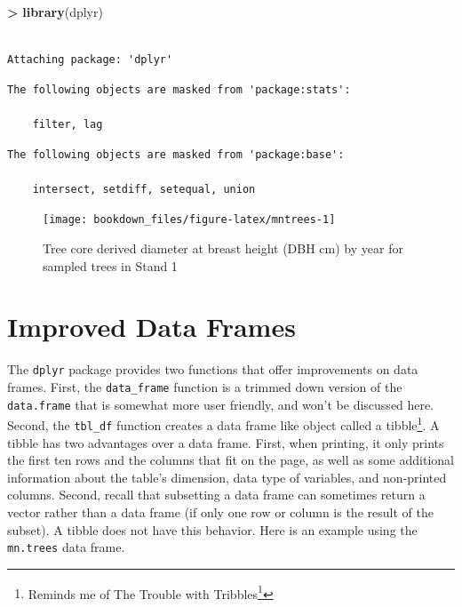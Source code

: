 \documentclass[]{krantz}
\makeatletter
\newenvironment{Shaded}{\begin{snugshade}}{\end{snugshade}}
\newcommand{\KeywordTok}[1]{\textcolor[rgb]{0.27,0.27,0.27}{\textbf{#1}}}
\newcommand{\StringTok}[1]{\textcolor[rgb]{0.5,0.5,0.5}{#1}}
\newcommand{\OperatorTok}[1]{\textcolor[rgb]{0.43,0.43,0.43}{\textbf{#1}}}
\newcommand{\NormalTok}[1]{#1}
\renewcommand{\href}[2]{#2\footnote{\url{#1}}}
\newenvironment{kframe}{%
\medskip{}
\setlength{\fboxsep}{.8em}
 \def\at@end@of@kframe{}%
 \ifinner\ifhmode%
  \def\at@end@of@kframe{\end{minipage}}%
  \begin{minipage}{\columnwidth}%
 \fi\fi%
 \def\FrameCommand##1{\hskip\@totalleftmargin \hskip-\fboxsep
 \colorbox{shadecolor}{##1}\hskip-\fboxsep
     \hskip-\linewidth \hskip-\@totalleftmargin \hskip\columnwidth}%
 \MakeFramed {\advance\hsize-\width
   \@totalleftmargin\z@ \linewidth\hsize
   \@setminipage}}%
 {\par\unskip\endMakeFramed%
 \at@end@of@kframe}
\renewenvironment{Shaded}{\begin{kframe}}{\end{kframe}}
\theoremstyle{definition}
\theoremstyle{definition}
\theoremstyle{definition}
\theoremstyle{remark}
\makeatother
\begin{document}
\begin{Shaded}
\begin{Highlighting}[]
\OperatorTok{>}\StringTok{ }\KeywordTok{library}\NormalTok{(dplyr)}
\end{Highlighting}
\end{Shaded}

\begin{verbatim}

Attaching package: 'dplyr'
\end{verbatim}

\begin{verbatim}
The following objects are masked from 'package:stats':

    filter, lag
\end{verbatim}

\begin{verbatim}
The following objects are masked from 'package:base':

    intersect, setdiff, setequal, union
\end{verbatim}

\begin{figure}

{\centering \texttt{[image: bookdown\_files/figure-latex/mntrees-1]} 

}

\caption{Tree core derived diameter at breast height (DBH cm) by year for sampled trees in Stand 1}\label{fig:mntrees}
\end{figure}

\section{Improved Data Frames}\label{improved-data-frames}

The \texttt{dplyr} package provides two functions that offer
improvements on data frames. First, the \texttt{data\_frame} function is
a trimmed down version of the \texttt{data.frame} that is somewhat more
user friendly, and won't be discussed here. Second, the \texttt{tbl\_df}
function creates a data frame like object called a tibble\footnote{Reminds
  me of
  \href{https://en.wikipedia.org/wiki/The_Trouble_with_Tribbles}{The
  Trouble with Tribbles}}. A tibble has two advantages over a data
frame. First, when printing, it only prints the first ten rows and the
columns that fit on the page, as well as some additional information
about the table's dimension, data type of variables, and non-printed
columns. Second, recall that subsetting a data frame can sometimes
return a vector rather than a data frame (if only one row or column is
the result of the subset). A tibble does not have this behavior. Here is
an example using the \texttt{mn.trees} data frame.
\end{document}
